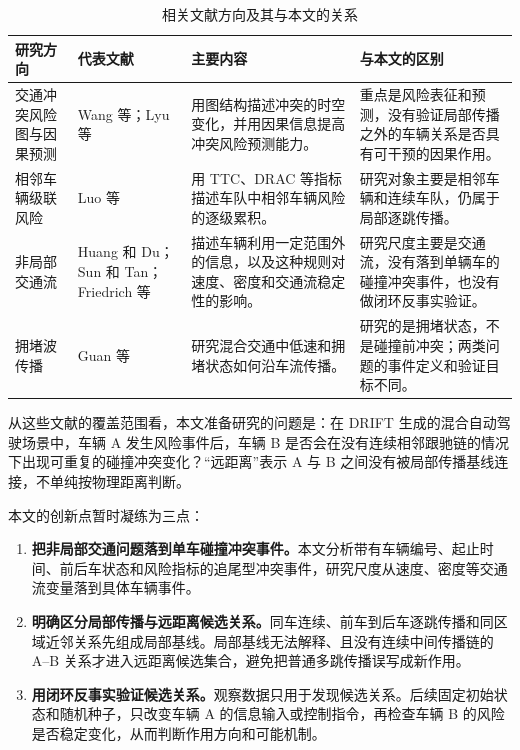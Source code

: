 \documentclass[UTF8,zihao=5,a4paper]{ctexart}
\begin{document}
\begin{table}[H]
\centering
\small
\caption{相关文献方向及其与本文的关系}
\label{tab:literature-directions}
\begin{tabularx}{\textwidth}{
  >{\raggedright\arraybackslash}p{2.15cm}
  >{\raggedright\arraybackslash}p{2.65cm}
  Y
  Y}
\toprule
研究方向 & 代表文献 & 主要内容 & 与本文的区别 \\
\midrule
交通冲突风险图与因果预测
& Wang 等\cite{wang2024conflict}；Lyu 等\cite{lyu2025causal}
& 用图结构描述冲突的时空变化，并用因果信息提高冲突风险预测能力。
& 重点是风险表征和预测，没有验证局部传播之外的车辆关系是否具有可干预的因果作用。 \\
\addlinespace
相邻车辆级联风险
& Luo 等\cite{luo2026crm}
& 用 TTC、DRAC 等指标描述车队中相邻车辆风险的逐级累积。
& 研究对象主要是相邻车辆和连续车队，仍属于局部逐跳传播。 \\
\addlinespace
非局部交通流
& Huang 和 Du\cite{huang2022nonlocal}；Sun 和 Tan\cite{sun2020lookahead}；Friedrich 等\cite{friedrich2022network}
& 描述车辆利用一定范围外的信息，以及这种规则对速度、密度和交通流稳定性的影响。
& 研究尺度主要是交通流，没有落到单辆车的碰撞冲突事件，也没有做闭环反事实验证。 \\
\addlinespace
拥堵波传播
& Guan 等\cite{guan2025jam}
& 研究混合交通中低速和拥堵状态如何沿车流传播。
& 研究的是拥堵状态，不是碰撞前冲突；两类问题的事件定义和验证目标不同。 \\
\bottomrule
\end{tabularx}
\end{table}

从这些文献的覆盖范围看，本文准备研究的问题是：在 DRIFT 生成的混合自动驾驶场景中，车辆 A 发生风险事件后，车辆 B 是否会在没有连续相邻跟驰链的情况下出现可重复的碰撞冲突变化？“远距离”表示 A 与 B 之间没有被局部传播基线连接，不单纯按物理距离判断。

本文的创新点暂时凝练为三点：
\begin{enumerate}
  \item \textbf{把非局部交通问题落到单车碰撞冲突事件。}本文分析带有车辆编号、起止时间、前后车状态和风险指标的追尾型冲突事件，研究尺度从速度、密度等交通流变量落到具体车辆事件。
  \item \textbf{明确区分局部传播与远距离候选关系。}同车连续、前车到后车逐跳传播和同区域近邻关系先组成局部基线。局部基线无法解释、且没有连续中间传播链的 A--B 关系才进入远距离候选集合，避免把普通多跳传播误写成新作用。
  \item \textbf{用闭环反事实验证候选关系。}观察数据只用于发现候选关系。后续固定初始状态和随机种子，只改变车辆 A 的信息输入或控制指令，再检查车辆 B 的风险是否稳定变化，从而判断作用方向和可能机制。
\end{enumerate}
\end{document}
